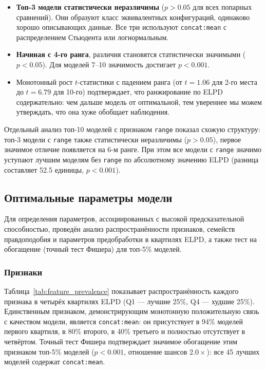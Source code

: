 \documentclass[14pt]{mmcs_article}
\begin{document}
\begin{itemize}
	\item \textbf{Топ-3 модели статистически неразличимы}
	($p > 0.05$ для всех попарных сравнений). Они
	образуют класс эквивалентных конфигураций,
	одинаково хорошо описывающих данные. Все три
	используют \texttt{concat:mean} с распределением
	Стьюдента или логнормальным.
	
	\item \textbf{Начиная с 4-го ранга}, различия становятся
	статистически значимыми ($p < 0.05$). Для моделей
	7--10 значимость достигает $p < 0.001$.
	
	\item Монотонный рост $t$-статистики с падением ранга
	(от $t = 1.06$ для 2-го места до $t = 6.79$ для
	10-го) подтверждает, что ранжирование по ELPD
	содержательно: чем дальше модель от оптимальной,
	тем увереннее мы можем утверждать, что она хуже обобщает наблюдения.
\end{itemize}

Отдельный анализ топ-10 моделей с признаком \texttt{range}
показал схожую структуру: топ-3 модели с \texttt{range}
также статистически неразличимы ($p > 0.05$), первое
значимое отличие появляется на 6-м ранге. При этом все
модели с \texttt{range} значимо уступают лучшим моделям без
\texttt{range} по абсолютному значению ELPD (разница
составляет 52.5 единицы, $p < 0.001$).


\subsection{Оптимальные параметры модели}

Для определения параметров, ассоциированных с высокой
предсказательной способностью, проведён анализ
распространённости признаков, семейств правдоподобия и
параметров предобработки в квартилях ELPD, а также тест на
обогащение (точный тест Фишера) для топ-5\% моделей.

\subsubsection*{Признаки}

Таблица~\ref{tab:feature_prevalence} показывает
распространённость каждого признака в четырёх квартилях ELPD
(Q1 — лучшие 25\%, Q4 — худшие 25\%). Единственным признаком,
демонстрирующим монотонную положительную связь с качеством
модели, является \texttt{concat:mean}: он присутствует в 94\%
моделей первого квартиля, в 80\% второго, в 40\% третьего и
полностью отсутствует в четвёртом. Точный тест Фишера
подтверждает значимое обогащение этим признаком топ-5\% моделей
($p < 0.001$, отношение шансов $2.0\times$): все 45 лучших
моделей содержат \texttt{concat:mean}.
\end{document}
